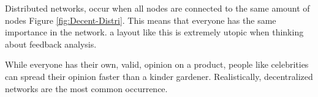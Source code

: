 \par
Distributed networks, occur when all nodes are connected to the same amount of nodes Figure \ref{fig:Decent-Distri}. This means that everyone has the same importance in the network. a layout like this is extremely utopic when thinking about feedback analysis. 
\par
While everyone has their own, valid, opinion on a product, people like celebrities can spread their opinion faster than a kinder gardener. Realistically, decentralized networks are the most common occurrence.


